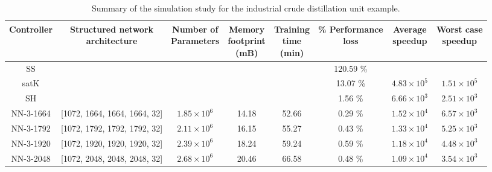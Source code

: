 \documentclass[preprint,5p, twocolumn, authoryear]{elsarticle}
\begin{document}
\begin{table}[t]
    \caption{Summary of the simulation study for the 
    industrial crude distillation unit example.}
\begin{tabular}{ |c|c|c|c|c|c|c|c| }
          \hline
          Controller & \thead{Structured network \\ architecture} & 
          \thead{Number of \\ Parameters} & 
          \thead{Memory \\ footprint \\ (mB)} & \thead{Training \\ time \\ (min)} &
          \thead{\% Performance\\ loss} & \thead{Average \\ speedup} & \thead{Worst case \\ speedup} \\
          \hline
      SS &  &  & &  & 120.59 \% &  & \\ 
  satK &  &  &   &  & 13.07 \% & $4.83 \times 10^5$ & $1.51 \times 10^5$ \\ 
  SH &  &  &  &  & 1.56 \% & $6.66 \times 10^3$  & $2.51 \times 10^3$ \\ 
  NN-3-1664 & [1072, 1664, 1664, 1664, 32] & $1.85 \times 10^6$ & 14.18 & 52.66 & 0.29 \% & $1.52 \times 10^4$ & $6.57 \times 10^3$  \\ 
  NN-3-1792 & [1072, 1792, 1792, 1792, 32]  & $2.11 \times 10^6$ & 16.15  & 55.27 & 0.43 \% & $1.33 \times 10^4$ & $5.25 \times 10^3$ \\ 
  NN-3-1920 & [1072, 1920, 1920, 1920, 32]  & $2.39 \times 10^6$ & 18.24  & 59.24 & 0.59 \% & $1.18 \times 10^4$ & $4.48 \times 10^3$ \\ 
  NN-3-2048 & [1072, 2048, 2048, 2048, 32]  & $2.68 \times 10^6$ & 20.46  & 66.58 & 0.48 \% & $1.09 \times 10^4$ & $3.54 \times 10^3$\\ 
\hline
\end{tabular}
\label{table:cdu}      
\end{table}
\end{document}
